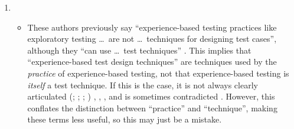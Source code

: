 \begin{enumerate}
    \item %
          \expBasedCatMain{}
          \ifnotpaper
              \begin{itemize}
                  \item These authors previously say ``experience-based testing
                        practices like exploratory testing \dots\ are not
                        \dots\ techniques for designing test cases'', although
                        they ``can use \dots\ test techniques''
                        \citeyearpar[p.~viii]{IEEE2021}. This implies that
                        ``experience-based test design techniques'' are
                        techniques used by the \emph{practice} of experience-based
                        testing, not that experience-based testing is
                        \emph{itself} a test technique. If this is the case, it
                        is not always clearly articulated
                        \ifnotpaper
                            (\citealp[pp.~4,~22]{IEEE2022}; \citeyear[p.~4]{IEEE2021};
                            \citealp[p.~5-13]{SWEBOK2024}; \citealpISTQB{})
                        \else
                            \cite[pp.~4,~22]{IEEE2022}, \cite[p.~4]{IEEE2021},
                            \cite[p.~5-13]{SWEBOK2024}, \cite{ISTQB}
                        \fi and is sometimes contradicted \citep[p.~46]{Firesmith2015}.
                        However, this conflates the distinction between
                        ``practice'' and ``technique'', making these terms less
                        useful, so this may just be a mistake.



\end{itemize}
\end{enumerate}
